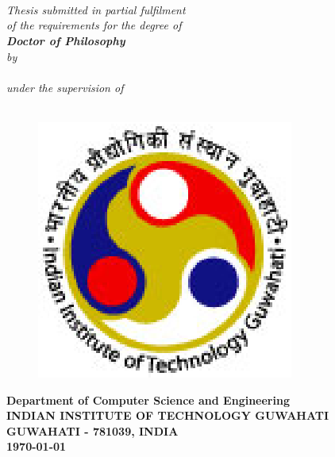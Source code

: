 \chapter*{}
\thispagestyle{empty}
\begin{center}
\textheight 16in \textwidth 12.5in {\huge\sf  \textbf{\the\phdtitle}}\\[20ex]
{\Large{\textit{
{Thesis submitted in partial fulfilment \\of the requirements
for the degree of\\
[5ex]{\Large \bf Doctor of Philosophy}
}}}}\\
[5ex] \large\emph{by} \\[1ex]
{\sf \sf \Large\bf{\the\name}}\\[5ex]
\large\textit{under the supervision of}\\[2ex]
{\Large \bf \the\guide} \\[5ex]

 \begin{figure}
    \begin{minipage}{\linewidth}
      \centering
      \includegraphics[scale=.9]{0-title/iitg_logo}
    \end{minipage} 
  \end{figure}

{\large \bf Department of Computer Science and Engineering}  \\[1ex]
{\Large \bf{INDIAN INSTITUTE OF TECHNOLOGY GUWAHATI \\GUWAHATI - 781039, INDIA}}\\
{\large\bf {\today}}
\end{center}
\restoregeometry
